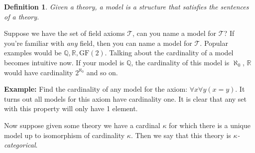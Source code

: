 \documentclass{article}
\newtheorem{defn}{Definition}
\begin{document}
\begin{defn}
  Given a theory, a model is a structure that satisfies the sentences of a
  theory.
\end{defn}

Suppose we have the set of field axioms $\mathcal{T}$, can you name a model for
$\mathcal{T}$? If you're familiar with \textit{any} field, then you can name a
model for $\mathcal{T}$. Popular examples would be $\mathbb{Q},
\mathbb{R},\text{GF}(2)$. Talking about the cardinality of a model becomes
intuitive now. If your model is $\mathbb{Q}$, the cardinality of this model is $\aleph_{0}$, $\mathbb{R}$ would
have cardinality $2^{\aleph_{0}}$ and so on. \vspace{10pt}

\noindent \textbf{Example:} Find the cardinality of any model for the axiom:
$\forall x \forall y (x = y)$. It turns out all models for this axiom have
cardinality one. It is clear that any set with this property will only have 1 element.\vspace{10pt}

Now suppose given some theory we
have a cardinal $\kappa$ for which there is a unique model up to isomorphism of
cardinality $\kappa$. Then we say that this theory is $\kappa$\textit{-categorical}.
\end{document}
